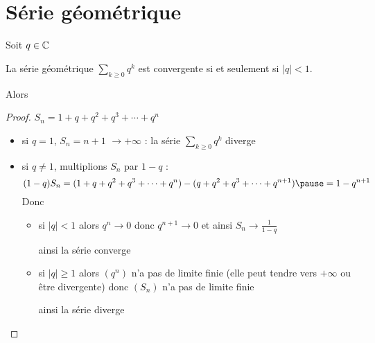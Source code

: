 \section{Série géométrique}

\begin{frame}
Soit $q\in \mathbb{C}$ \pause
\begin{proposition}
La série géométrique $\displaystyle\sum_{k \ge 0} q^k$ est convergente 
si et seulement si $|q|<1$.

\pause
Alors
\end{proposition}

\end{frame}


\begin{frame}

\begin{proof}
$S_n=1+q+q^2+q^3+\cdots+q^n$

\begin{itemize}
  \item \pause si $q=1$, $S_n = n+1$ \pause $\to +\infty$  \pause : la série $\sum_{k \ge 0} q^k$ diverge
  
  \item \pause si $q \neq 1$, multiplions $S_n$ par $1-q$ :  
  \pause
$$(1-q)S_n=(1+q+q^2+q^3+\cdots+q^n)-(q+q^2+q^3+\cdots+q^{n+1}) \pause =1-q^{n+1}$$
\pause
Donc

\begin{itemize}
  \item \pause si $|q|<1$ \pause alors $q^n \to 0$ donc $q^{n+1} \to 0$ \pause et ainsi $S_n \to \frac{1}{1-q}$

\pause  
  ainsi la série converge
\item \pause si $|q| \ge 1$ \pause alors $(q^n)$ n'a pas de limite finie
(elle peut tendre vers $+\infty$ ou être divergente) \pause donc $(S_n)$ n'a pas de limite finie

\pause
ainsi la série diverge \qedhere
\end{itemize}
\end{itemize}
\end{proof}
\end{frame}


